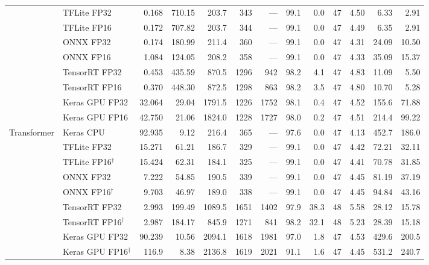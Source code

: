 \documentclass[11pt,a4paper]{article}
\begin{document}
\begin{table}[p]
{\begin{tabular}{@{}l l r r r r r r r r r r r@{}}
 & TFLite FP32 & 0.168 & 710.15 & 203.7 & 343 & --- & 99.1 & 0.0 & 47 & 4.50 & 6.33 & 2.91 \\
 & TFLite FP16 & 0.172 & 707.82 & 203.7 & 344 & --- & 99.1 & 0.0 & 47 & 4.49 & 6.35 & 2.91 \\
 & ONNX FP32 & 0.174 & 180.99 & 211.4 & 360 & --- & 99.1 & 0.0 & 47 & 4.31 & 24.09 & 10.50 \\
 & ONNX FP16 & 1.084 & 124.05 & 208.2 & 358 & --- & 99.1 & 0.0 & 47 & 4.33 & 35.09 & 15.37 \\
 & TensorRT FP32 & 0.453 & 435.59 & 870.5 & 1296 & 942 & 98.2 & 4.1 & 47 & 4.83 & 11.09 & 5.50 \\
 & TensorRT FP16 & 0.370 & 448.30 & 872.5 & 1298 & 863 & 98.2 & 3.5 & 47 & 4.80 & 10.70 & 5.28 \\
 & Keras GPU FP32 & 32.064 & 29.04 & 1791.5 & 1226 & 1752 & 98.1 & 0.4 & 47 & 4.52 & 155.6 & 71.88 \\
 & Keras GPU FP16 & 42.750 & 21.06 & 1824.0 & 1228 & 1727 & 98.0 & 0.2 & 47 & 4.51 & 214.4 & 99.22 \\
\midrule
\multirow{9}{*}{Transformer} & Keras CPU & 92.935 & 9.12 & 216.4 & 365 & --- & 97.6 & 0.0 & 47 & 4.13 & 452.7 & 186.0 \\
 & TFLite FP32 & 15.271 & 61.21 & 186.7 & 329 & --- & 99.1 & 0.0 & 47 & 4.42 & 72.21 & 32.11 \\
 & TFLite FP16$^\dagger$ & 15.424 & 62.31 & 184.1 & 325 & --- & 99.1 & 0.0 & 47 & 4.41 & 70.78 & 31.85 \\
 & ONNX FP32 & 7.222 & 54.85 & 190.5 & 339 & --- & 99.1 & 0.0 & 47 & 4.45 & 81.19 & 37.19 \\
 & ONNX FP16$^\dagger$ & 9.703 & 46.97 & 189.0 & 338 & --- & 99.1 & 0.0 & 47 & 4.45 & 94.84 & 43.16 \\
 & TensorRT FP32 & 2.993 & 199.49 & 1089.5 & 1651 & 1402 & 97.9 & 38.3 & 48 & 5.58 & 28.12 & 15.78 \\
 & TensorRT FP16$^\dagger$ & 2.987 & 184.17 & 845.9 & 1271 & 841 & 98.2 & 32.1 & 48 & 5.23 & 28.39 & 15.18 \\
 & Keras GPU FP32 & 90.239 & 10.56 & 2094.1 & 1618 & 1981 & 97.0 & 1.8 & 47 & 4.53 & 429.6 & 200.5 \\
 & Keras GPU FP16$^\dagger$ & 116.9 & 8.38 & 2136.8 & 1619 & 2021 & 91.1 & 1.6 & 47 & 4.45 & 531.2 & 240.7 \\
\bottomrule
\end{tabular}%
}
\end{table}
\end{document}
